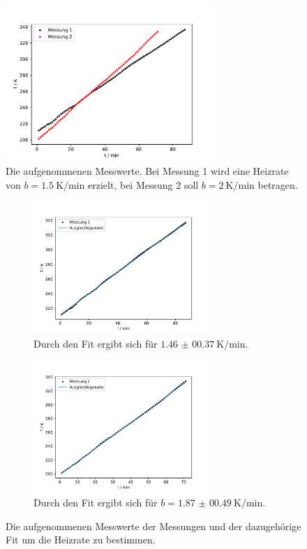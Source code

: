   \begin{figure}[H]
    \centering
    \includegraphics[width = 0.7\textwidth]{build/zeit_temp.pdf}
    \caption{Die aufgenommenen Messwerte. Bei Messung 1 wird eine Heizrate von $b = \SI{1.5}{\kelvin\per\minute}$ erzielt, 
    bei Messung 2 soll $b = \SI{2}{\kelvin\per\minute}$ betragen.}
    \label{fig:t_T_plot}
  \end{figure} %

  \begin{figure}[H]
    \begin{subfigure}[b]{.5\linewidth}
      \centering
      \includegraphics[height=5cm, keepaspectratio]{build/zeit_temp_fit_1.pdf}
      \caption{Durch den Fit ergibt sich für $\SI{1.46(0037)}{\kelvin\per\minute}$.}
    \label{fig:t_T_plot_1_Ausgleich}
    \end{subfigure}
    \begin{subfigure}[b]{.5\linewidth}
      \centering
      \includegraphics[height=5cm, keepaspectratio]{build/zeit_temp_fit_2.pdf}
      \caption{Durch den Fit ergibt sich für $b = \SI{1.87(0049)}{\kelvin\per\minute}$.}
    \label{fig:t_T_plot_2_Ausgleich} 
    \end{subfigure}
    \caption{Die aufgenommenen Messwerte der Messungen und der dazugehörige Fit um die Heizrate zu bestimmen.}
  \end{figure} %


